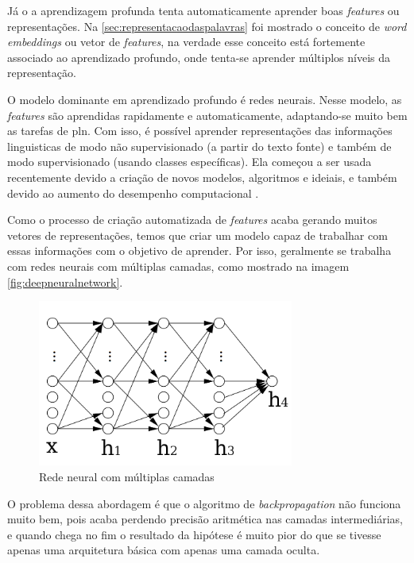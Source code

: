 Já o a aprendizagem profunda tenta automaticamente aprender boas \textit{features} ou representações. Na \autoref{sec:representacaodaspalavras} foi mostrado o conceito de \textit{word embeddings} ou vetor de \textit{features}, na verdade esse conceito está fortemente associado ao aprendizado profundo, onde tenta-se aprender múltiplos níveis da representação. 

O modelo dominante em aprendizado profundo é redes neurais. Nesse modelo, as \textit{features} são aprendidas rapidamente e automaticamente, adaptando-se muito bem as tarefas de \ac{pln}. Com isso, é possível aprender representações das informações linguisticas de modo não supervisionado (a partir do texto fonte) e também de modo supervisionado (usando classes específicas). Ela começou a ser usada recentemente devido a criação de novos modelos, algoritmos e ideiais, e também devido ao aumento do desempenho computacional \cite{deeplearningfornlp}.

Como o processo de criação automatizada de \textit{features} acaba gerando muitos vetores de representações, temos que criar um modelo capaz de trabalhar com essas informações com o objetivo de aprender. Por isso, geralmente se trabalha com redes neurais com múltiplas camadas, como mostrado na imagem \autoref{fig:deepneuralnetwork}. 

\begin{figure}
\centering
\caption{Rede neural com múltiplas camadas} \label{fig:deepneuralnetwork}
\includegraphics[width=0.75\textwidth]{img/exemplodeepneuralnetwork}
\end{figure}

O problema dessa abordagem é que o algoritmo de \textit{backpropagation} não funciona muito bem, pois acaba perdendo precisão aritmética nas camadas intermediárias, e quando chega no fim o resultado da hipótese é muito pior do que se tivesse apenas uma arquitetura básica com apenas uma camada oculta. 


